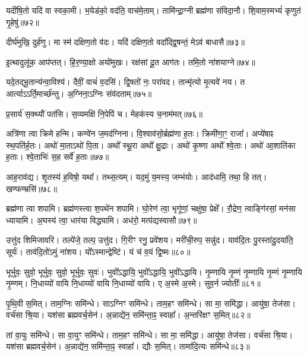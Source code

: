 यदी॑षि॒तो यदि॑ वा स्वका॒मी। 
भ॒येड॑को॒ वद॑ति॒ वाच॑मे॒ताम्। 
तामि॑न्द्रा॒ग्नी ब्रह्म॑णा संविदा॒नौ। 
शि॒वाम॒स्मभ्यं॑ कृणुतं गृ॒हेषु॑॥७२॥
\anuvakamend

दीर्घ॑मुखि॒ दुर्\mbox{}ह॑णु। 
मा स्म॑ दक्षिण॒तो व॑दः। 
यदि॑ दक्षिण॒तो वदा᳚द्द्वि॒षन्तं॒ मेऽव॑ बाधासै॥७३॥
\anuvakamend

इ॒त्थादुलू॑क॒ आप॑प्तत्। 
हि॒र॒ण्या॒क्षो अयो॑मुखः। 
रक्ष॑सां दू॒त आग॑तः। 
तमि॒तो ना॑शयाग्ने॥७४॥
\anuvakamend


यदे॒तद्भू॒तान्य॑न्वा॒विश्य॑। 
दैवीं॒ वाचं॑ व॒दसि॑। 
द्वि॒षतो॑ नः॒ परा॑वद। 
तान्मृ॑त्यो मृ॒त्यवे॑ नय। 
त आर्त्याऽऽर्ति॒मार्च्छ॑न्तु। 
अ॒ग्निना॒ऽग्निः संव॑दताम्॥७५॥
\anuvakamend


प्र॒सार्य॑ स॒क्थ्यौ॑ पत॑सि। 
स॒व्यमक्षि॑ नि॒पेपि॑ च। 
मेहक॑स्य च॒नाम॑मत्॥७६॥
\anuvakamend


अत्रि॑णा त्वा क्रिमे हन्मि। 
कण्वे॑न ज॒मद॑ग्निना। 
वि॒श्वाव॑सो॒र्ब्रह्म॑णा ह॒तः। 
क्रिमी॑णा॒ꣳ॒ राजा᳚। 
अप्ये॑षाꣴ स्थ॒पति॑र्\mbox{}ह॒तः। 
अथो॑ मा॒ताऽथो॑ पि॒ता। 
अथो᳚ स्थू॒रा अथो᳚ क्षु॒द्राः। 
अथो॑ कृ॒ष्णा अथो᳚ श्वे॒ताः। 
अथो॑ आ॒शाति॑का ह॒ताः। 
श्वे॒ताभिः॑ स॒ह सर्वे॑ ह॒ताः॥७७॥
\anuvakamend


आह॒राव॑द्य। 
शृ॒तस्य॑ ह॒विषो॒ यथा᳚। 
तथ्स॒त्यम्। 
यद॒मुं य॒मस्य॒ जम्भ॑योः। 
आद॑धामि॒ तथा॒ हि तत्। 
खण्फण्म्रसि॑॥७८॥
\anuvakamend


ब्रह्म॑णा त्वा शपामि। 
ब्रह्म॑णस्त्वा श॒पथे॑न शपामि। 
घो॒रेण॑ त्वा॒ भृगू॑णां॒ चक्षु॑षा॒ प्रेक्षे᳚। 
रौ॒द्रेण॒ त्वाङ्गि॑रसां॒ मन॑सा ध्यायामि। 
अ॒घस्य॑ त्वा॒ धार॑या विद्ध्यामि। 
अध॑रो॒ मत्प॑द्यस्वासौ॥७९॥%
\anuvakamend


उत्तु॑द शिमिजावरि। 
तल्पे॑जे॒ तल्प॒ उत्तु॑द। 
गि॒रीꣳ रनु॒ प्रवे॑शय। 
मरी॑ची॒रुप॒ सन्नु॑द। 
याव॑दि॒तः पु॒रस्ता॑दु॒दया॑ति॒ सूर्यः॑। 
ताव॑दि॒तो॑ऽमुं ना॑शय। 
यो᳚ऽस्मान्द्वेष्टि॑। 
यं च॑ व॒यं द्वि॒ष्मः॥८०॥
\anuvakamend


भूर्भुवः॒ सुवो॒ भूर्भुवः॒ सुवो॒ भूर्भुवः॒ सुवः॑। 
भुवो᳚ऽद्धायि॒ भुवो᳚ऽद्धायि॒ भुवो᳚ऽद्धायि। 
नृ॒म्णायि नृ॒म्णं नृ॒म्णायि नृ॒म्णं नृ॒म्णायि नृ॒म्णम्। 
नि॒धाय्यो॑ वायि नि॒धाय्यो॑ वायि नि॒धाय्यो॑ वायि। 
ए अ॒स्मे अ॒स्मे। 
सुव॒र्न ज्योतीः᳚॥८१॥
\anuvakamend


पृ॒थि॒वी स॒मित्। 
ताम॒ग्निः समि॑न्धे। 
साऽग्निꣳ समि॑न्धे। 
ताम॒हꣳ समि॑न्धे। 
सा मा॒ समि॑द्धा। 
आयु॑षा॒ तेज॑सा। 
वर्च॑सा श्रि॒या। 
यश॑सा ब्रह्मवर्च॒सेन॑। 
अ॒न्नाद्ये॑न॒ समि॑न्ता॒ꣴ॒ स्वाहा᳚। 
अ॒न्तरि॑क्षꣳ स॒मित्॥८२॥

तां वा॒युः समि॑न्धे। 
सा वा॒युꣳ समि॑न्धे। 
ताम॒हꣳ समि॑न्धे। 
सा मा॒ समि॑द्धा। 
आयु॑षा॒ तेज॑सा। 
वर्च॑सा श्रि॒या। 
यश॑सा ब्रह्मवर्च॒सेन॑। 
अ॒न्नाद्ये॑न॒ समि॑न्ता॒ꣴ॒ स्वाहा᳚। 
द्यौः स॒मित्। 
तामा॑दि॒त्यः समि॑न्धे॥८३॥

